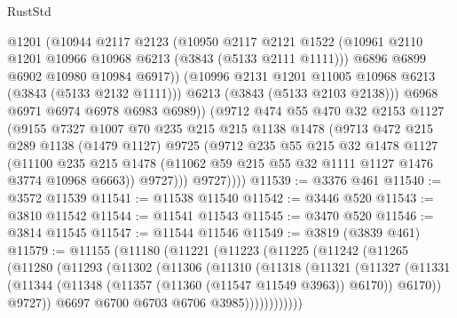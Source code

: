 \begin{lexlean}{RustStd}
\begin{coremodule}
                @1201
                (@10944
                  @2117
                  @2123
                  (@10950
                    @2117
                    @2121
                    @1522
                    (@10961 @2110 @1201 @10966 @10968 @6213 (@3843 (@5133 @2111 @1111)))
                    @6896
                    @6899
                    @6902
                    @10980
                    @10984
                    @6917))
                (@10996 @2131 @1201 @11005 @10968 @6213 (@3843 (@5133 @2132 @1111)))
                @6213
                (@3843 (@5133 @2103 @2138)))
              @6968
              @6971
              @6974
              @6978
              @6983
              @6989))
          (@9712
            @474
            @55
            @470
            @32
            @2153
            @1127
            (@9155
              @7327
              @1007
              @70
              @235
              @215
              @215
              @1138
              @1478
              (@9713
                @472
                @215
                @289
                @1138
                (@1479 @1127)
                @9725
                (@9712
                  @235
                  @55
                  @215
                  @32
                  @1478
                  @1127
                  (@11100
                    @235
                    @215
                    @1478
                    (@11062 @59 @215 @55 @32 @1111 @1127 @1476 @3774 @10968 @6663))
                  @9727)))
            @9727))))
@11539 := @3376 @461
@11540 := @3572 @11539
@11541 := @11538 @11540
@11542 := @3446 @520
@11543 := @3810 @11542
@11544 := @11541 @11543
@11545 := @3470 @520
@11546 := @3814 @11545
@11547 := @11544 @11546
@11549 := @3819 (@3839 @461)
@11579 := @11155
    (@11180
      (@11221
        (@11223
          (@11225
            (@11242
              (@11265
                (@11280
                  (@11293
                    (@11302
                      (@11306
                        (@11310
                          (@11318
                            (@11321
                              (@11327
                                (@11331
                                  (@11344
                                    (@11348 (@11357 (@11360 (@11547 @11549 @3963)) @6170))
                                    @6170))
                                @9727))
                            @6697
                            @6700
                            @6703
                            @6706
                            @3985))))))))))))

\end{coremodule}
\end{lexlean}
